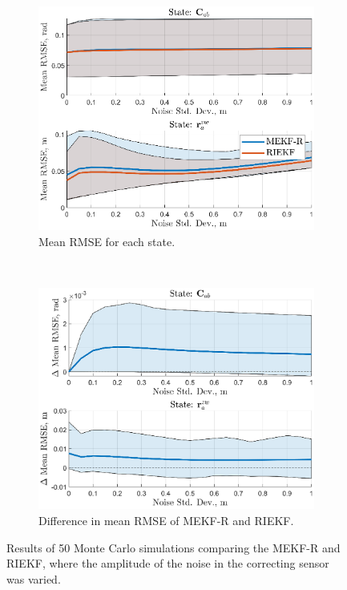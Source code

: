\begin{figure}
	\centering
	\begin{subfigure}[b]{0.5\textwidth}
		\includegraphics[width=\textwidth]{figs/se3/noise_trials/comp_noise_rmse_state_Corr_R.eps}
		\caption{Mean RMSE for each state.}
	\end{subfigure}
	~
	\begin{subfigure}[b]{0.5\textwidth}
		\includegraphics[width=\textwidth]{figs/se3/noise_trials/comp_noise_diff_state_Corr_R.eps}
		\caption{Difference in mean RMSE of MEKF-R and RIEKF.}
	\end{subfigure}
	\caption[Results comparing the MEKF-R and RIEKF varying correcting sensor noise.]{Results of 50 Monte Carlo simulations comparing the MEKF-R and RIEKF, where the amplitude of the noise in the correcting sensor was varied. }
	\label{fig:comp_noise_corr_R}
\end{figure}

